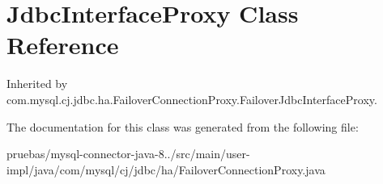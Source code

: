 \hypertarget{class_jdbc_interface_proxy}{}\section{Jdbc\+Interface\+Proxy Class Reference}
\label{class_jdbc_interface_proxy}


Inherited by com.\+mysql.\+cj.\+jdbc.\+ha.\+Failover\+Connection\+Proxy.\+Failover\+Jdbc\+Interface\+Proxy.



The documentation for this class was generated from the following file\+:\begin{DoxyCompactItemize}
\item 
pruebas/mysql-\/connector-\/java-\/8../src/main/user-\/impl/java/com/mysql/cj/jdbc/ha/Failover\+Connection\+Proxy.\+java\end{DoxyCompactItemize}
